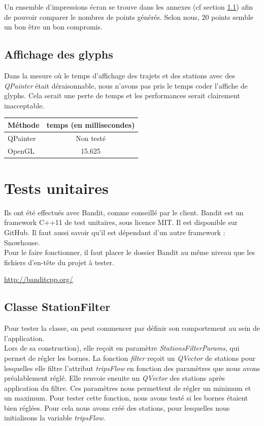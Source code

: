 \documentclass[12pt]{article}
\begin{document}
	    Un ensemble d'impressions écran se trouve dans les annexes (cf section \ref{}) afin
	    de pouvoir comparer le nombres de points générés. Selon nous, 20 points semble un bon être
	    un bon compromis.\\
	    
		\subsection{Affichage des glyphs}
		Dans la mesure où le temps d'affichage des trajets et des stations avec des \textit{QPainter}
		était déraisonnable, nous n'avons pas pris le temps coder l'affiche de glyphs. Cela serait 
		une perte de temps et les performances serait clairement inacceptable.
		
		\begin{center}
			\begin{tabular}{| l | c |}
			\hline
			\textbf{Méthode} & \textbf{temps (en millisecondes)} \\ \hline
			QPainter & Non testé\\ \hline
			OpenGL & 15.625 \\ \hline
		    \end{tabular}
	    \end{center}
		
	\newpage
	\section{Tests unitaires}
	Ils ont été effectués avec Bandit, comme conseillé par le client.
	Bandit est un framework C++11 de test unitaires, sous licence MIT. Il est disponible sur GitHub. 		Il faut aussi savoir qu’il est dépendant d’un autre framework : Snowhouse.\\

	Pour le faire fonctionner, il faut placer le dossier Bandit au même niveau que les fichiers d’en-tête du projet à tester.

	\url{http://banditcpp.org/}
	
		\subsection{Classe StationFilter}
		Pour tester la classe, on peut commencer par définir son comportement au sein de l’application.\\

		Lors de sa construction), elle reçoit en paramètre \textit{StationsFilterParams}, qui permet de régler les bornes. La fonction \textit{filter} reçoit un \textit{QVector} de stations pour lesquelles elle filtre l’attribut \textit{tripsFlow} en fonction des paramètres que nous avons préalablement réglé. Elle renvoie ensuite un \textit{QVector} des stations après application du filtre. Ces paramètres nous permettent de régler un minimum et un maximum. Pour tester cette fonction, nous avons testé si les bornes étaient bien réglées. Pour cela nous avons créé des stations, pour lesquelles nous initialisons la variable \textit{tripsFlow}.\\
\end{document}
